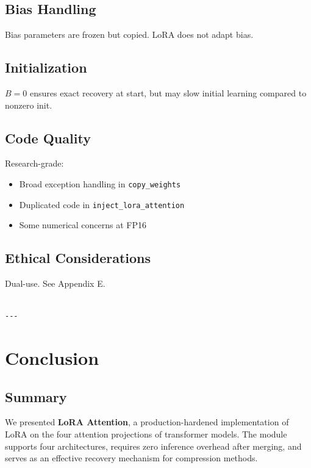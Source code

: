 \subsection{Bias Handling}

Bias parameters are frozen but copied. LoRA does not adapt bias.

\subsection{Initialization}

$B = 0$ ensures exact recovery at start, but may slow initial learning 
compared to nonzero init.

\subsection{Code Quality}

Research-grade:
\begin{itemize}
\item Broad exception handling in \texttt{copy\_weights}
\item Duplicated code in \texttt{inject\_lora\_attention}
\item Some numerical concerns at FP16

\end{itemize}
\subsection{Ethical Considerations}

Dual-use. See Appendix E.
\begin{lstlisting}

---
\end{lstlisting}

\section{Conclusion}

\subsection{Summary}

We presented \textbf{LoRA Attention}, a production-hardened implementation of 
LoRA on the four attention projections of transformer models. The module 
supports four architectures, requires zero inference overhead after merging, 
and serves as an effective recovery mechanism for compression methods.

